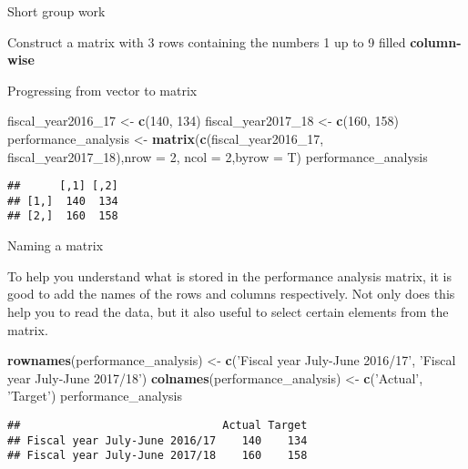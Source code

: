 \documentclass[ignorenonframetext,]{beamer}
\newenvironment{Shaded}{\begin{snugshade}}{\end{snugshade}}
\newcommand{\KeywordTok}[1]{\textcolor[rgb]{0.13,0.29,0.53}{\textbf{#1}}}
\newcommand{\DataTypeTok}[1]{\textcolor[rgb]{0.13,0.29,0.53}{#1}}
\newcommand{\DecValTok}[1]{\textcolor[rgb]{0.00,0.00,0.81}{#1}}
\newcommand{\StringTok}[1]{\textcolor[rgb]{0.31,0.60,0.02}{#1}}
\newcommand{\NormalTok}[1]{#1}
\begin{document}
\begin{frame}{Short group work}

Construct a matrix with 3 rows containing the numbers 1 up to 9 filled
\textbf{column-wise}

\end{frame}

\begin{frame}[fragile]{Progressing from vector to matrix}

\begin{Shaded}
\begin{Highlighting}[]
\NormalTok{fiscal_year2016_}\DecValTok{17}\NormalTok{ <-}\StringTok{ }\KeywordTok{c}\NormalTok{(}\DecValTok{140}\NormalTok{, }\DecValTok{134}\NormalTok{)     }
\NormalTok{fiscal_year2017_}\DecValTok{18}\NormalTok{ <-}\StringTok{ }\KeywordTok{c}\NormalTok{(}\DecValTok{160}\NormalTok{, }\DecValTok{158}\NormalTok{)  }
\NormalTok{performance_analysis <-}\StringTok{ }\KeywordTok{matrix}\NormalTok{(}\KeywordTok{c}\NormalTok{(fiscal_year2016_}\DecValTok{17}\NormalTok{,}
\NormalTok{                        fiscal_year2017_}\DecValTok{18}\NormalTok{),}\DataTypeTok{nrow =} \DecValTok{2}\NormalTok{, }
                        \DataTypeTok{ncol =} \DecValTok{2}\NormalTok{,}\DataTypeTok{byrow =}\NormalTok{ T)}
\NormalTok{performance_analysis}
\end{Highlighting}
\end{Shaded}

\begin{verbatim}
##      [,1] [,2]
## [1,]  140  134
## [2,]  160  158
\end{verbatim}

\end{frame}

\begin{frame}[fragile]{Naming a matrix}

To help you understand what is stored in the performance analysis
matrix, it is good to add the names of the rows and columns
respectively. Not only does this help you to read the data, but it also
useful to select certain elements from the matrix.

\begin{Shaded}
\begin{Highlighting}[]
\KeywordTok{rownames}\NormalTok{(performance_analysis) <-}
\StringTok{  }\KeywordTok{c}\NormalTok{(}\StringTok{'Fiscal year July-June 2016/17'}\NormalTok{,}
   \StringTok{'Fiscal year July-June 2017/18'}\NormalTok{)}
\KeywordTok{colnames}\NormalTok{(performance_analysis) <-}\StringTok{ }\KeywordTok{c}\NormalTok{(}\StringTok{'Actual'}\NormalTok{, }\StringTok{'Target'}\NormalTok{)}
\NormalTok{performance_analysis}
\end{Highlighting}
\end{Shaded}

\begin{verbatim}
##                               Actual Target
## Fiscal year July-June 2016/17    140    134
## Fiscal year July-June 2017/18    160    158
\end{verbatim}

\end{frame}
\end{document}

